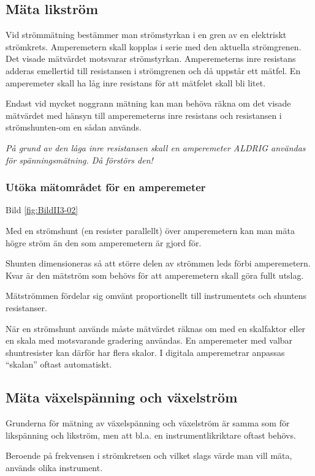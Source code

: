 \subsection{Mäta likström}

Vid strömmätning bestämmer man strömstyrkan i en gren av en elektriskt
strömkrets.  Amperemetern skall kopplas i serie med den aktuella
strömgrenen.  Det visade mätvärdet motsvarar strömstyrkan.
Amperemeterns inre resistans adderas emellertid till resistansen i
strömgrenen och då uppstår ett mätfel.  En amperemeter skall ha låg
inre resistans för att mätfelet skall bli litet.

Endast vid mycket noggrann mätning kan man behöva räkna om det visade
mätvärdet med hänsyn till amperemeterns inre resistans och resistansen
i strömshunten-om en sådan används.

\emph{På grund av den låga inre resistansen skall en amperemeter
  ALDRIG användas för spänningsmätning. Då förstörs den!}

\subsubsection{Utöka mätområdet för en amperemeter}

Bild \ref{fig:BildII3-02}

Med en strömshunt (en resister parallellt) över amperemetern kan man
mäta högre ström än den som amperemetern är gjord för.

Shunten dimensioneras så att större delen av strömmen leds förbi
amperemetern.  Kvar är den mätström som behövs för att amperemetern
skall göra fullt utslag.

Mätströmmen fördelar sig omvänt proportionellt till instrumentets och
shuntens resistanser.

När en strömshunt används måste mätvärdet räknas om med en skalfaktor
eller en skala med motsvarande gradering användas. En amperemeter med
valbar shuntresister kan därför har flera skalor. I digitala
amperemetrar anpassas ``skalan'' oftast automatiskt.

\subsection{Mäta växelspänning och växelström}

Grunderna för mätning av växelspänning och växelström är samma som för
likspänning och likström, men att bl.a. en instrumentlikriktare oftast
behövs.

Beroende på frekvensen i strömkretsen och vilket slags värde man vill
mäta, används olika instrument.

